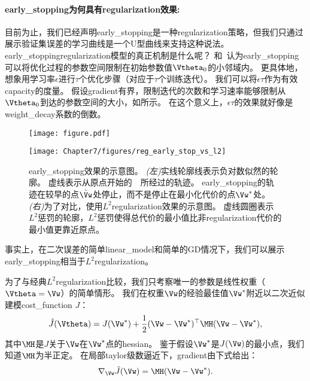 
\paragraph{\gls{early_stopping}为何具有\gls{regularization}效果:}
目前为止，我们已经声明\gls{early_stopping}是一种\gls{regularization}策略，但我们只通过展示验证集误差的学习曲线是一个U型曲线来支持这种说法。
\gls{early_stopping}\gls{regularization}模型的真正机制是什么呢？ 
\cite{Bishop1995}和~\cite{Sjoberg95}认为\gls{early_stopping}可以将优化过程的参数空间限制在初始参数值$\Vtheta_0$的小邻域内。
更具体地，想象用学习率$\epsilon$进行$\tau$个优化步骤（对应于$\tau$个训练迭代）。
我们可以将$\epsilon \tau$作为有效\gls{capacity}的度量。
假设\gls{gradient}有界，限制迭代的次数和学习速率能够限制从$\Vtheta_0$到达的参数空间的大小，如所示。
在这个意义上，$\epsilon \tau$的效果就好像是\gls{weight_decay}系数的倒数。

\begin{figure}[!htb]
\ifOpenSource
\centerline{\texttt{[image: figure.pdf]}}
\else
\centerline{\texttt{[image: Chapter7/figures/reg\_early\_stop\_vs\_l2]}}
\fi
\caption{\gls{early_stopping}效果的示意图。
\emph{(左)}实线轮廓线表示负对数似然的轮廓。
虚线表示从原点开始的~~所经过的轨迹。 %
\gls{early_stopping}的轨迹在较早的点$\tilde \Vw$处停止，而不是停止在最小化代价的点$\Vw^*$处。
\emph{(右)}为了对比，使用$L^2$\gls{regularization}效果的示意图。
虚线圆圈表示$L^2$惩罚的轮廓，$L^2$惩罚使得总代价的最小值比非\gls{regularization}代价的最小值更靠近原点。
}
\label{fig:chap7_reg_l1_vs_l2_mistake}
\end{figure}

事实上，在二次误差的简单\gls{linear_model}和简单的\gls{GD}情况下，我们可以展示\gls{early_stopping}相当于$L^2$\gls{regularization}。

为了与经典$L^2$\gls{regularization}比较，我们只考察唯一的参数是线性权重（$\Vtheta = \Vw$）的简单情形。
我们在权重$\Vw$的经验最佳值$\Vw^*$附近以二次近似建模\gls{cost_function} $J$：
\begin{align}
 \hat J(\Vtheta) = J(\Vw^*) + \frac{1}{2}  (\Vw- \Vw^*)^\top \MH  (\Vw - \Vw^*),
\end{align}
其中$\MH$是$J$关于$\Vw$在$\Vw^*$点的\gls{hessian}。
鉴于假设$\Vw^*$是$J(\Vw)$的最小点，我们知道$\MH$为半正定。
在局部\gls{taylor}级数逼近下，\gls{gradient}由下式给出：
\begin{align}
 \nabla_{\Vw} \hat J (\Vw) = \MH (\Vw - \Vw^*).
\end{align}

